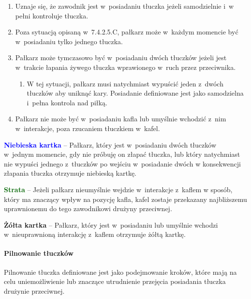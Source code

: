 \documentclass[12pt,a4paper]{article}
\newcommand\yellowcard[1]{\bgroup\textcolor{darkyellow}{\textbf{#1}}}
\newcommand\bluecard[1]{\bgroup\textcolor{blue}{\textbf{#1}}}
\newcommand\other[1]{\bgroup\textcolor{darkgreen}{\textbf{#1}}}
\begin{document}
\begin{enumerate}
	\item
	      Uznaje się, że zawodnik jest w~posiadaniu tłuczka jeżeli samodzielnie
	      i~w pełni kontroluje tłuczka.
	\item
	      Poza sytuacją opisaną w~7.4.2.5.C, pałkarz może w~każdym momencie być
	      w~posiadaniu tylko jednego tłuczka.
	\item
	      Pałkarz może tymczasowo być w~posiadaniu dwóch tłuczków jeżeli jest w~trakcie łapania żywego tłuczka wprawionego w~ruch przez przeciwnika.

	      \begin{enumerate}
		      \item
		            W tej sytuacji, pałkarz musi natychmiast wypuścić jeden z~dwóch
		            tłuczków aby uniknąć kary. Posiadanie definiowane jest jako
		            samodzielna i~pełna kontrola nad piłką.
	      \end{enumerate}
	\item
	      Pałkarz nie może być w~posiadaniu kafla lub umyślnie wchodzić z~nim w~interakcje, poza rzucaniem tłuczkiem w~kafel.
\end{enumerate}

\bluecard{Niebieska kartka} -- Pałkarz, który jest w~posiadaniu dwóch
tłuczków w~jednym momencie, gdy nie próbuję on złapać tłuczka, lub który
natychmiast nie wypuści jednego z~tłuczków po wejściu w~posiadanie dwóch
w konsekwencji złapania tłuczka otrzymuje niebieską kartkę.

\other{Strata} -- Jeżeli pałkarz nieumyślnie wejdzie w~interakcje z~kaflem
w sposób, który ma znaczący wpływ na pozycję kafla, kafel zostaje
przekazany najbliższemu uprawnionemu do tego zawodnikowi drużyny
przeciwnej.

\yellowcard{Żółta kartka} -- Pałkarz, który jest w~posiadaniu lub umyślnie
wchodzi w~nieuprawnioną interakcję z~kaflem otrzymuje żółtą kartkę.

\paragraph{Pilnowanie tłuczków}
Pilnowanie tłuczka definiowane
jest jako podejmowanie kroków, które mają na celu uniemożliwienie lub
znaczące utrudnienie przejęcia posiadania tłuczka drużynie przeciwnej.
\end{document}
